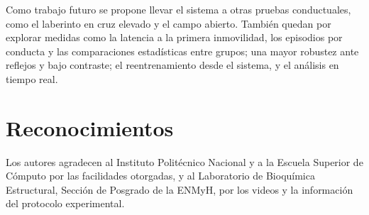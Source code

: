 \documentclass[conference,letterpaper]{IEEEtran}
\begin{document}
Como trabajo futuro se propone llevar el sistema a otras pruebas conductuales, como el
laberinto en cruz elevado y el campo abierto. También quedan por explorar medidas como la
latencia a la primera inmovilidad, los episodios por conducta y las comparaciones
estadísticas entre grupos; una mayor robustez ante reflejos y bajo contraste; el
reentrenamiento desde el sistema, y el análisis en tiempo real.

\section*{Reconocimientos}

Los autores agradecen al Instituto Politécnico Nacional y a la Escuela Superior de Cómputo
por las facilidades otorgadas, y al Laboratorio de Bioquímica Estructural, Sección de
Posgrado de la ENMyH, por los videos y la información del protocolo experimental.
\end{document}

